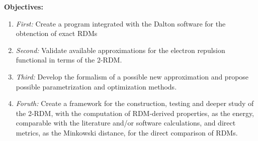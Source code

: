 \vspace{0.3cm}
\textbf{Objectives:}
\begin{enumerate}[label={}]
    \item \textit{First:} Create a program integrated with the Dalton software for the obtenction
        of exact RDMs
    \item \textit{Second:} Validate available approximations for the electron repulsion functional
        in terms of the 2-RDM.
    \item \textit{Third:} Develop the formalism of a possible new approximation and propose possible
        parametrization and optimization methods.
    \item \textit{Foruth:} Create a framework for the construction, testing and deeper study of
        the 2-RDM, with the computation of RDM-derived properties, as the energy,
        comparable with the literature and/or software calculations, and
        direct metrics, as the Minkowski distance, for the direct comparison
        of RDMs.
\end{enumerate}
